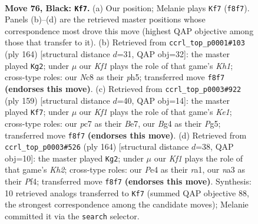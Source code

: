 \documentclass[11pt]{article}
\begin{document}
\clearpage

\begin{figure}[p]\centering
\begin{subfigure}{0.46\textwidth}\centering
\resizebox{\linewidth}{!}{%
\newchessgame
\chessboard[
  setfen={2n2k1K/2P5/p1r5/P4p1p/4pBb1/N5P1/8/R7 b - - 59 76},
  showmover=false,
  pgfstyle=straightmove, color=movearrow, markmove={f8-f7}
]}
\caption{}
\end{subfigure}\hfill
\begin{subfigure}{0.46\textwidth}\centering
\resizebox{\linewidth}{!}{%
\newchessgame
\chessboard[
  setfen={5k2/2b5/5p2/pR3B1p/P3P2P/1Pr5/8/7K w - - 1 83},
  showmover=false,
  pgfstyle=straightmove, color=movearrow, markmove={h1-g2}
]}
\caption{}
\end{subfigure}
\\[4pt]
\begin{subfigure}{0.46\textwidth}\centering
\resizebox{\linewidth}{!}{%
\newchessgame
\chessboard[
  setfen={4k3/2R1b2p/1p5P/p3p1p1/P1P1P1K1/1r3B2/8/8 b - - 10 80},
  showmover=false,
  pgfstyle=straightmove, color=movearrow, markmove={e8-f7}
]}
\caption{}
\end{subfigure}\hfill
\begin{subfigure}{0.46\textwidth}\centering
\resizebox{\linewidth}{!}{%
\newchessgame
\chessboard[
  setfen={8/7p/1p3k2/1BbR1p1P/P1P2P2/8/7K/r7 w - - 85 83},
  showmover=false,
  pgfstyle=straightmove, color=movearrow, markmove={h2-g2}
]}
\caption{}
\end{subfigure}
\caption{\textbf{Move 76, Black: \texttt{Kf7}.} (a) Our position; Melanie plays \texttt{Kf7} (\texttt{f8f7}). Panels (b)--(d) are the retrieved master positions whose correspondence most drove this move (highest QAP objective among those that transfer to it). (b) Retrieved from \texttt{ccrl\_top\_p0001\#103} (ply 164) [structural distance $d$=31, QAP obj=32]: the master played \texttt{Kg2}; under $\mu$ our \emph{Kf1} plays the role of that game's \emph{Kh1}; cross-type roles: our \emph{N}c8 as their \emph{p}h5; transferred move \texttt{f8f7} \textbf{(endorses this move)}. (c) Retrieved from \texttt{ccrl\_top\_p0003\#922} (ply 159) [structural distance $d$=40, QAP obj=14]: the master played \texttt{Kf7}; under $\mu$ our \emph{Kf1} plays the role of that game's \emph{Ke1}; cross-type roles: our \emph{p}c7 as their \emph{B}e7, our \emph{B}g4 as their \emph{P}g5; transferred move \texttt{f8f7} \textbf{(endorses this move)}. (d) Retrieved from \texttt{ccrl\_top\_p0003\#526} (ply 164) [structural distance $d$=38, QAP obj=10]: the master played \texttt{Kg2}; under $\mu$ our \emph{Kf1} plays the role of that game's \emph{Kh2}; cross-type roles: our \emph{P}e4 as their \emph{r}a1, our \emph{n}a3 as their \emph{P}f4; transferred move \texttt{f8f7} \textbf{(endorses this move)}. Synthesis: 10 retrieved analogs transferred to \texttt{Kf7} (summed QAP objective 88, the strongest correspondence among the candidate moves); Melanie committed it via the \texttt{search} selector.}
\label{fig:thought-m151}
\end{figure}
\end{document}
